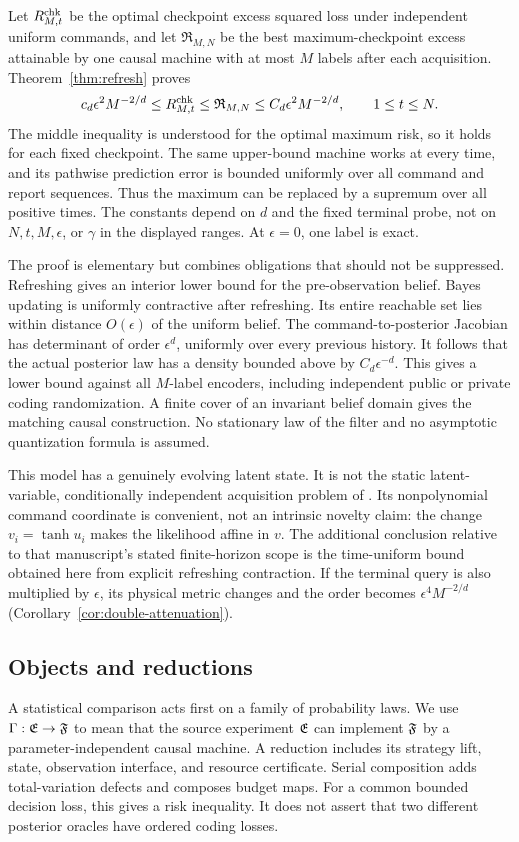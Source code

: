 Let $R_{M,t}^{\rm chk}$ be the optimal checkpoint excess squared loss under
independent uniform commands, and let $\mathfrak R_{M,N}$ be the best
maximum-checkpoint excess attainable by one causal machine with at most
$M$ labels after each acquisition. Theorem~\ref{thm:refresh} proves
\begin{equation}\label{eq:intro-refresh-law}
 c_d\epsilon^2M^{-2/d}
 \le R_{M,t}^{\rm chk}
 \le \mathfrak R_{M,N}
 \le C_d\epsilon^2M^{-2/d},\qquad 1\le t\le N.
\end{equation}
The middle inequality is understood for the optimal maximum risk, so it
holds for each fixed checkpoint. The same upper-bound machine works at every
time, and its pathwise prediction error is bounded uniformly over all
command and report sequences. Thus the maximum can be replaced by a
supremum over all positive times. The constants depend on $d$ and the fixed
terminal probe, not on $N,t,M,\epsilon$, or $\gamma$ in the displayed
ranges. At $\epsilon=0$, one label is exact.

The proof is elementary but combines obligations that should not be
suppressed. Refreshing gives an interior lower bound for the pre-observation
belief. Bayes updating is uniformly contractive after refreshing. Its entire
reachable set lies within distance $O(\epsilon)$ of the uniform belief.
The command-to-posterior Jacobian has determinant of order
$\epsilon^d$, uniformly over every previous history. It follows that the
actual posterior law has a density bounded above by $C_d\epsilon^{-d}$.
This gives a lower bound against all $M$-label encoders, including independent
public or private coding randomization. A finite cover of an invariant
belief domain gives the matching causal construction. No stationary law of
the filter and no asymptotic quantization formula is assumed.

This model has a genuinely evolving latent state. It is not the static
latent-variable, conditionally independent acquisition problem of
\cite{QiA1}. Its nonpolynomial command coordinate is convenient, not an
intrinsic novelty claim: the change $v_i=\tanh u_i$ makes the likelihood
affine in $v$. The additional conclusion relative to that manuscript's stated
finite-horizon scope is the time-uniform bound obtained here from explicit
refreshing contraction. If the terminal query is also multiplied by
$\epsilon$, its physical metric changes and the order becomes
$\epsilon^4M^{-2/d}$ (Corollary~\ref{cor:double-attenuation}).

\subsection{Objects and reductions}
A statistical comparison acts first on a family of probability laws. We use
$\Gamma:\mathfrak E\to\mathfrak F$ to mean that the source experiment $\mathfrak E$ can implement
$\mathfrak F$ by a parameter-independent causal machine. A reduction includes its
strategy lift, state, observation interface, and resource certificate.
Serial composition adds total-variation defects and composes budget maps.
For a common bounded decision loss, this gives a risk inequality. It does
not assert that two different posterior oracles have ordered coding losses.

